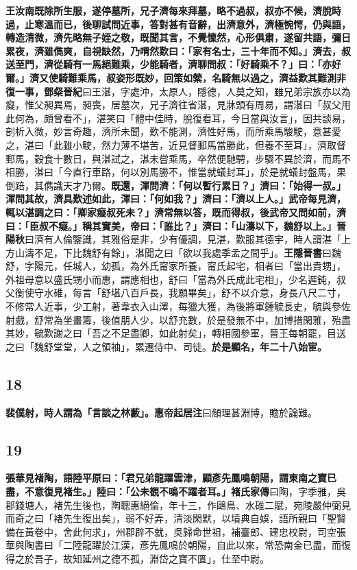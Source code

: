 \textbf{王汝南既除所生服，遂停墓所，兄子濟每來拜墓，略不過叔，叔亦不候，濟脫時過，止寒溫而已，後聊試問近事，答對甚有音辭，出濟意外，濟極惋愕，仍與語，轉造清微，濟先略無子姪之敬，既聞其言，不覺懍然，心形俱肅，遂留共語，彌日累夜，濟雖儁爽，自視缺然，乃喟然歎曰：「家有名士，三十年而不知。」濟去，叔送至門，濟從騎有一馬絕難乘，少能騎者，濟聊問叔：「好騎乘不？」曰：「亦好爾。」濟又使騎難乘馬，叔姿形既妙，回策如縈，名騎無以過之，濟益歎其難測非復一事，}{\footnotesize \textbf{鄧粲晉紀}曰王湛，字處沖，太原人，隱德，人莫之知，雖兄弟宗族亦以為癡，惟父昶異焉，昶喪，居墓次，兄子濟往省湛，見牀頭有周易，謂湛曰「叔父用此何為，頗曾看不」，湛笑曰「體中佳時，脫復看耳，今日當與汝言」，因共談易，剖析入微，妙言奇趣，濟所未聞，歎不能測，濟性好馬，而所乘馬駿駛，意甚愛之，湛曰「此雖小駛，然力薄不堪苦，近見督郵馬當勝此，但養不至耳」，濟取督郵馬，穀食十數日，與湛試之，湛未嘗乘馬，卒然便馳騁，步驟不異於濟，而馬不相勝，湛曰「今直行車路，何以別馬勝不，惟當就蟻封耳」，於是就蟻封盤馬，果倒踣，其儁識天才乃爾。}\textbf{既還，渾問濟：「何以暫行累日？」濟曰：「始得一叔。」渾問其故，濟具歎述如此，渾曰：「何如我？」濟曰：「濟以上人。」武帝每見濟，輒以湛調之曰：「卿家癡叔死未？」濟常無以答，既而得叔，後武帝又問如前，濟曰：「臣叔不癡。」稱其實美，帝曰：「誰比？」濟曰：「山濤以下，魏舒以上。」}{\footnotesize \textbf{晉陽秋}曰濟有人倫鑒識，其雅俗是非，少有優調，見湛，歎服其德宇，時人謂湛「上方山濤不足，下比魏舒有餘」，湛聞之曰「欲以我處季孟之間乎」。\textbf{王隱晉書}曰魏舒，字陽元，任城人，幼孤，為外氏甯家所養，甯氏起宅，相者曰「當出貴甥」，外祖母意以盛氏甥小而惠，謂應相也，舒曰「當為外氏成此宅相」，少名遲鈍，叔父衡使守水碓，每言「舒堪八百戶長，我願畢矣」，舒不以介意，身長八尺二寸，不修常人近事，少工射，著韋衣入山澤，每獵大獲，為後將軍鍾毓長史，毓與參佐射戲，舒常為坐畫籌，後值朋人少，以舒充數，於是發無不中，加博措閑雅，殆盡其妙，毓歎謝之曰「吾之不足盡卿，如此射矣」，轉相國參軍，晉王每朝罷，目送之曰「魏舒堂堂，人之領袖」，累遷侍中、司徒。}\textbf{於是顯名，年二十八始宦。}

\subsection*{18}

\textbf{裴僕射，時人謂為「言談之林藪」。}{\footnotesize \textbf{惠帝起居注}曰頠理甚淵博，贍於論難。}

\subsection*{19}

\textbf{張華見褚陶，語陸平原曰：「君兄弟龍躍雲津，顧彥先鳳鳴朝陽，謂東南之寶已盡，不意復見褚生。」陸曰：「公未覩不鳴不躍者耳。」}{\footnotesize \textbf{褚氏家傳}曰陶，字季雅，吳郡錢塘人，褚先生後也，陶聰惠絕倫，年十三，作鷗鳥、水碓二賦，宛陵嚴仲弼見而奇之曰「褚先生復出矣」，弱不好弄，清淡閑默，以墳典自娛，語所親曰「聖賢備在黃卷中，舍此何求」，州郡辟不就，吳歸命世祖，補臺郎、建忠校尉，司空張華與陶書曰「二陸龍躍於江漢，彥先鳳鳴於朝陽，自此以來，常恐南金已盡，而復得之於吾子，故知延州之德不孤，淵岱之寶不匱」，仕至中尉。}

